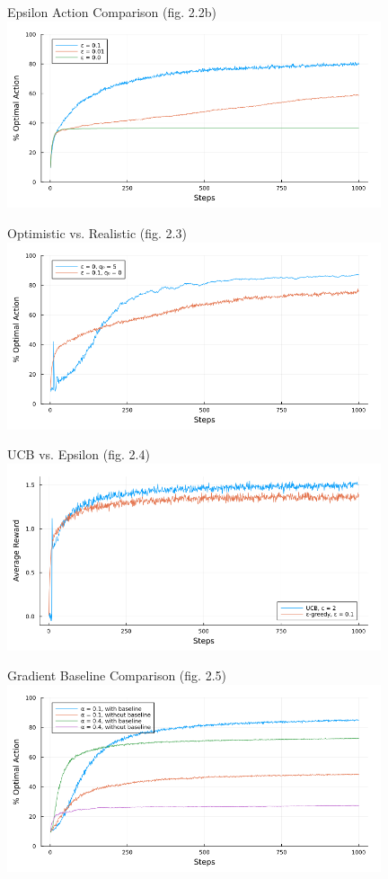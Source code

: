 \documentclass{beamer}
\begin{document}
    \begin{frame}{Epsilon Action Comparison (fig. 2.2b)}
  	\includegraphics[width=11cm]{ten_armed_testbed_epsilon_optimal.png}
  \end{frame}
  
\begin{frame}{Optimistic vs. Realistic (fig. 2.3)}
	\includegraphics[width=11cm]{ten_armed_testbed_optimistic.png}
\end{frame}
\begin{frame}{UCB vs. Epsilon (fig. 2.4)}
	\includegraphics[width=11cm]{ten_armed_testbed_ucb.png}
\end{frame}
\begin{frame}{Gradient Baseline Comparison (fig. 2.5)}
	\includegraphics[width=11cm]{ten_armed_testbed_gradient.png}
\end{frame}
\end{document}

